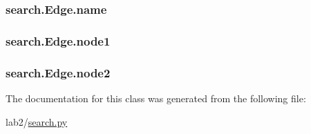 \subsubsection[{name}]{\setlength{\rightskip}{0pt plus 5cm}search.\+Edge.\+name}\label{classsearch_1_1_edge_a8c7e9c6b1ae728744825b17b07945d1a}
\hypertarget{classsearch_1_1_edge_a2d67303a400e0a0437658128ea8834f0}{}
\subsubsection[{node1}]{\setlength{\rightskip}{0pt plus 5cm}search.\+Edge.\+node1}\label{classsearch_1_1_edge_a2d67303a400e0a0437658128ea8834f0}
\hypertarget{classsearch_1_1_edge_a7eb563624f0f999e7dacbdaea118fe40}{}
\subsubsection[{node2}]{\setlength{\rightskip}{0pt plus 5cm}search.\+Edge.\+node2}\label{classsearch_1_1_edge_a7eb563624f0f999e7dacbdaea118fe40}


The documentation for this class was generated from the following file\+:\begin{DoxyCompactItemize}
\item 
lab2/\hyperlink{search_8py}{search.\+py}\end{DoxyCompactItemize}
